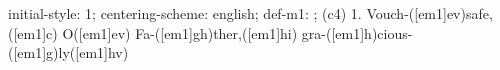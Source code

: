 initial-style: 1;
centering-scheme: english;
def-m1: \grealign;
(c4) 1. Vouch-([em1]ev)safe,([em1]c) O([em1]ev) Fa-([em1]gh)ther,([em1]hi) gra-([em1]h)cious-([em1]g)ly([em1]hv)